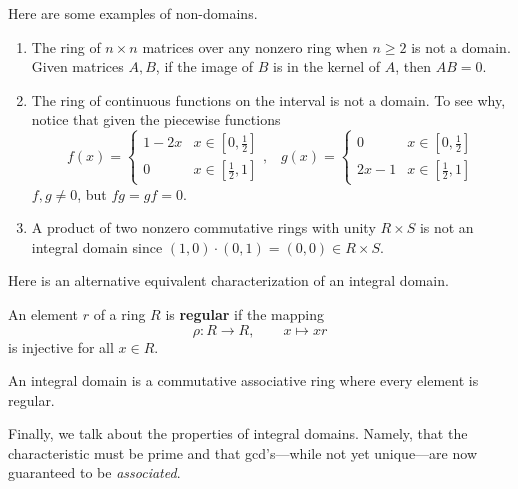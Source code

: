   \begin{example}
    Here are some examples of non-domains. 
    \begin{enumerate}
      \item The ring of $n \times n$ matrices over any nonzero ring when $ n \geq 2$ is not a domain. Given matrices $A, B$, if the image of $B$ is in the kernel of $A$, then $A B = 0$.
      \item The ring of continuous functions on the interval is not a domain. To see why, notice that given the piecewise functions 
      \begin{equation}
        f (x) = \begin{cases}
        1 - 2x & x \in [0, \frac{1}{2}] \\
        0 & x \in [\frac{1}{2}, 1] 
        \end{cases}, \; \;\;g (x) = \begin{cases}
        0 & x \in [0, \frac{1}{2}] \\
        2x - 1 & x \in [\frac{1}{2}, 1] 
        \end{cases}
      \end{equation}
      $f, g \neq 0$, but $f g = g f = 0$. 

      \item A product of two nonzero commutative rings with unity $R \times S$ is not an integral domain since $(1,0) \cdot (0, 1) = (0, 0) \in R \times S$. 
    \end{enumerate}
  \end{example}

  Here is an alternative equivalent characterization of an integral domain. 

  \begin{definition}
     An element $r$ of a ring $R$ is \textbf{regular} if the mapping 
     \begin{equation}
       \rho: R \longrightarrow R, \qquad x \mapsto x r
     \end{equation}
    is injective for all $x \in R$. 
  \end{definition}

  \begin{theorem}
    An integral domain is a commutative associative ring where every element is regular. 
  \end{theorem} 

  Finally, we talk about the properties of integral domains. Namely, that the characteristic must be prime and that gcd's---while not yet unique---are now guaranteed to be \textit{associated}. 

